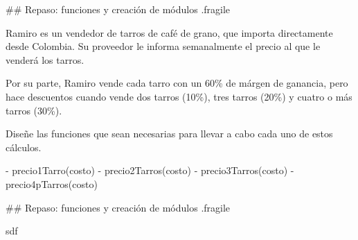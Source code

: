 ## Repaso: funciones y creación de módulos {.fragile}


\bgnblocknormal[justified]
Ramiro es un vendedor de tarros de café de grano, que importa directamente desde Colombia. Su proveedor
le informa semanalmente el precio al que le venderá los tarros.

Por su parte, Ramiro vende cada tarro con un 60\% de márgen de ganancia, pero hace descuentos cuando
vende dos tarros (10\%), tres tarros (20\%) y cuatro o más tarros (30\%).

Diseñe las funciones que sean necesarias para llevar a cabo cada uno de estos cálculos.
\trmblocknormal

\pause


- precio1Tarro(costo)
- precio2Tarros(costo)
- precio3Tarros(costo)
- precio4pTarros(costo)


## Repaso: funciones y creación de módulos {.fragile}

sdf
